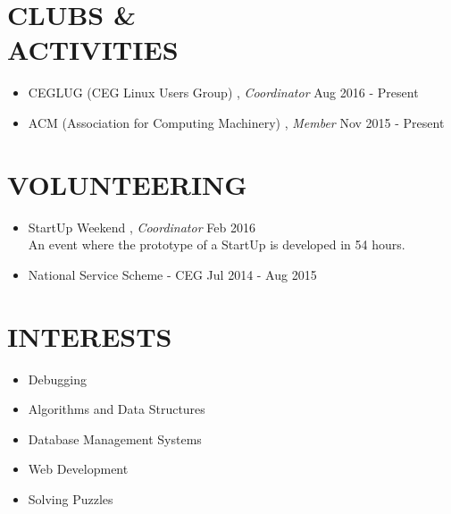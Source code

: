 \documentclass[margin, 10pt]{res} %
\begin{document}
\begin{resume}

\section{CLUBS \& \\ ACTIVITIES}
\begin{itemize}
\item CEGLUG (CEG Linux Users Group) , {\sl Coordinator} \hfill Aug 2016 - Present
\item ACM (Association for Computing Machinery) , {\sl Member} \hfill Nov 2015 - Present
\end{itemize}

\section{VOLUNTEERING}
\begin{itemize}
\item StartUp Weekend , {\sl Coordinator} \hfill Feb 2016 \\
An event where the prototype of a StartUp is developed in 54 hours.
\item National Service Scheme - CEG \hfill Jul 2014 - Aug 2015 
\end{itemize}

\section{INTERESTS} 
\begin{itemize}
\item Debugging
\item Algorithms and Data Structures
\item Database Management Systems
\item Web Development
\item Solving Puzzles
\end{itemize}


 

\end{resume}
\end{document}
